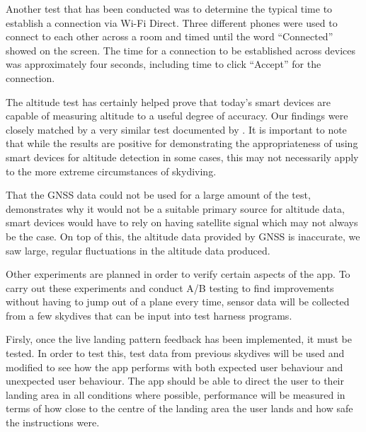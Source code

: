 \documentclass[11pt, a4paper, twocolumn]{article}
\begin{document}
Another test that has been conducted was to determine the typical time to establish a connection via Wi-Fi Direct. Three different phones were used to connect to each other across a room and timed until the word ``Connected'' showed on the screen. The time for a connection to be established across devices was approximately four seconds, including time to click ``Accept'' for the connection.

The altitude test has certainly helped prove that today's smart devices are capable of measuring altitude to a useful degree of accuracy. Our findings were closely matched by a very similar test documented by \textcite{he_atmospheric_2012}. It is important to note that while the results are positive for demonstrating the appropriateness of using smart devices for altitude detection in some cases, this may not necessarily apply to the more extreme circumstances of skydiving.

That the GNSS data could not be used for a large amount of the test, demonstrates why it would not be a suitable primary source for altitude data, smart devices would have to rely on having satellite signal which may not always be the case. On top of this, the altitude data provided by GNSS is inaccurate, we saw large, regular fluctuations in the altitude data produced.

Other experiments are planned in order to verify certain aspects of the app. To carry out these experiments and conduct A/B testing to find improvements without having to jump out of a plane every time, sensor data will be collected from a few skydives that can be input into test harness programs.

Firsly, once the live landing pattern feedback has been implemented, it must be tested. In order to test this, test data from previous skydives will be used and modified to see how the app performs with both expected user behaviour and unexpected user behaviour. The app should be able to direct the user to their landing area in all conditions where possible, performance will be measured in terms of how close to the centre of the landing area the user lands and how safe the instructions were.
\end{document}

